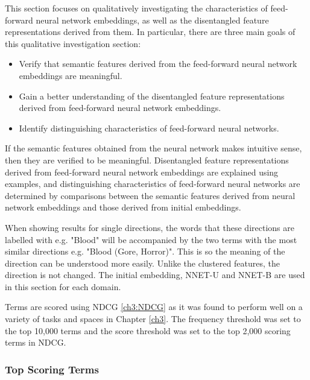 This  section  focuses on qualitatively investigating the characteristics of feed-forward neural network embeddings, as well as the disentangled feature representations derived from them. In particular, there are three main goals of this qualitative investigation section:

\begin{itemize}
	\item Verify that semantic features derived from the feed-forward neural network embeddings are meaningful.
	\item Gain a better understanding of the disentangled feature representations derived from feed-forward neural network embeddings.
	\item Identify distinguishing characteristics of feed-forward neural networks. 
\end{itemize}

If the semantic features obtained from the neural network makes intuitive sense, then they are verified  to be meaningful. Disentangled feature representations derived from feed-forward neural network embeddings are explained using examples, and  distinguishing characteristics of feed-forward neural networks are determined by comparisons between the semantic features derived from neural network embeddings and those derived from initial embeddings. %

When showing results for single directions, the words that these directions are labelled with e.g. "Blood" will be accompanied by the two terms with the most similar directions e.g. "Blood (Gore, Horror)". This is so the meaning of the direction can be understood more easily. Unlike the clustered features, the direction is not changed. The initial embedding, NNET-U and NNET-B are used in this section for each domain.  

Terms are scored using NDCG \ref{ch3:NDCG} as it was found to perform well on a variety of tasks and spaces in Chapter \ref{ch3}. The frequency threshold was set to the top 10,000 terms and the score threshold was set to the top 2,000 scoring terms in NDCG. 

\subsubsection{Top Scoring Terms}\label{ch5:topscore}

